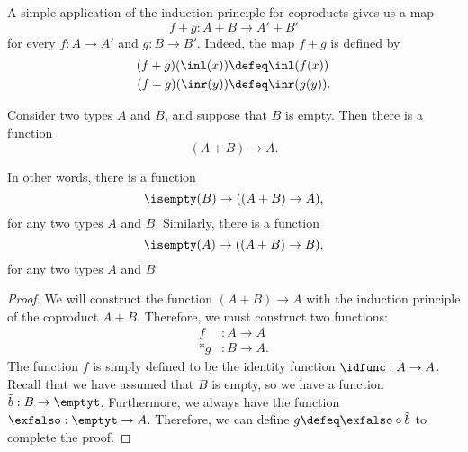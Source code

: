 \begin{rmk}\label{rmk:functor-coprod}
  A simple application of the induction principle for coproducts gives us a map
  \begin{equation*}
    f+g:A+B\to A'+B'
  \end{equation*}
  for every $f:A\to A'$ and $g:B\to B'$. Indeed, the map $f+g$ is defined by
  \begin{align*}
    (f+g)(\inl(x)) & \defeq \inl(f(x)) \\*
    (f+g)(\inr(y)) & \defeq \inr(g(y)).
  \end{align*}
\end{rmk}

\begin{prp}
  Consider two types $A$ and $B$, and suppose that $B$ is empty. Then there is a function
  \begin{equation*}
    (A+B)\to A.
  \end{equation*}
\end{prp}

\begin{rmk}
  In other words, there is a function
  \begin{equation*}
    \isempty(B) \to ((A+B)\to A),
  \end{equation*}
  for any two types $A$ and $B$. Similarly, there is a function
  \begin{equation*}
    \isempty(A)\to ((A+B)\to B),
  \end{equation*}
  for any two types $A$ and $B$.
\end{rmk}

\begin{proof}
  We will construct the function $(A+B)\to A$ with the induction principle of the coproduct $A+B$. Therefore, we must construct two functions:
  \begin{align*}
    f & : A\to A \\*
    g & : B\to A.
  \end{align*}
  The function $f$ is simply defined to be the identity function $\idfunc:A\to A$. Recall that we have assumed that $B$ is empty, so we have a function $\tilde{b}:B\to\emptyt$. Furthermore, we always have the function $\exfalso:\emptyt\to A$. Therefore, we can define $g\defeq \exfalso\circ \tilde{b}$ to complete the proof.
\end{proof}

